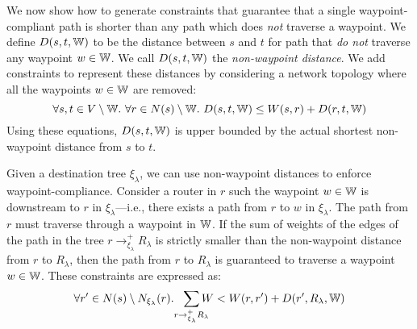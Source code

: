 \label{sec:waypoint-compliance-constraints}
We now show how to generate constraints that
guarantee that a single waypoint-compliant path is shorter
than any path which does \emph{not} traverse a waypoint. 
We define $D(s,t,\mathbb{W})$ to be the 
distance between $s$ and $t$ for path that \emph{do not}
 traverse any waypoint $w \in \mathbb{W}$.
We call  $D(s,t,\mathbb{W})$ the \emph{non-waypoint distance}.
  We add constraints to represent these distances by
  considering a network topology where all the  
  waypoints $w \in \mathbb{W}$ are removed:
\begin{equation} \label{eq:wdistance}
\forall s, t \in V \setminus \mathbb{W}. ~\forall r \in N(s) \setminus \mathbb{W}.~
D(s, t, \mathbb{W}) \leq W(s, r) + D(r,t,\mathbb{W})
\end{equation}
Using these equations,
$D(s,t,\mathbb{W})$ is upper bounded by the actual shortest non-waypoint distance from $s$ to $t$.


Given a destination tree $\xi_\lambda$, we can use
non-waypoint distances to enforce waypoint-compliance. Consider a 
router in $r$ such the waypoint $w \in \mathbb{W}$ is downstream to $r$ in $\xi_\lambda$---i.e.,
there exists a path from $r$ to $w$ in $\xi_\lambda$.
The path from $r$ must traverse through 
a waypoint in $\mathbb{W}$.  
If the sum of weights of the edges of
the path in the tree $r \rightarrow^+_{\xi_\lambda} R_\lambda$  
is strictly smaller than the non-waypoint 
distance from $r$ to $R_\lambda$, 
then the path from $r$ to $R_\lambda$ is guaranteed to traverse
a waypoint $w \in \mathbb{W}$. These constraints are expressed as:
\begin{equation} \label{eq:waypoint}
\forall r' \in N(s) \setminus N_{\xi_\lambda}(r).~~ \sum_{\mathclap{\substack{r \rightarrow^+_{\xi_\lambda} R_\lambda}}} 
W < 
W(r, r')+ D(r', R_\lambda, \waypt) 
\end{equation}

